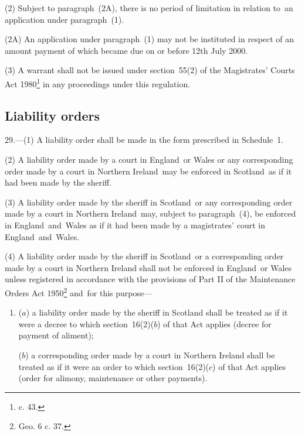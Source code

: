 \documentclass[12pt,a4paper]{article}
\begin{document}

(2) Subject to paragraph~(2A), there is no period of limitation in relation to~an application under paragraph~(1).

(2A) An application under paragraph~(1) may not be instituted in respect of an amount payment of which became due on or before 12th July 2000.

(3) A warrant shall not be issued under section~55(2) of the Magistrates' Courts Act 1980\footnote{ c. 43.} in any proceedings under this regulation.


\subsection[29. Liability orders]{Liability orders}

29.—(1) A liability order shall be made in the form prescribed in Schedule~1.

(2) A liability order made by a court in England~or Wales or any corresponding order made by a court in Northern Ireland~may be enforced in Scotland~as if it had been made by the sheriff.

(3) A liability order made by the sheriff in Scotland~or any corresponding order made by a court in Northern Ireland~may, subject to paragraph~(4), be enforced in England~and~Wales as if it had been made by a magistrates' court in England~and~Wales.

(4) A liability order made by the sheriff in Scotland~or a corresponding order made by a court in Northern Ireland shall not be enforced in England~or Wales unless registered in accordance with the provisions of 
Part II %
of the Maintenance Orders Act 1950\footnote{ Geo. 6 c. 37.} and~for this purpose—
\begin{enumerate}\item[]
($a$) a liability order made by the sheriff in Scotland shall be treated as if it were a decree to which section~16(2)($b$) of that Act applies (decree for payment of aliment);

($b$) a corresponding order made by a court in Northern Ireland shall be treated as if it were an order to which section~16(2)($c$) of that Act applies (order for alimony, maintenance or other payments).
\end{enumerate}
\end{document}
